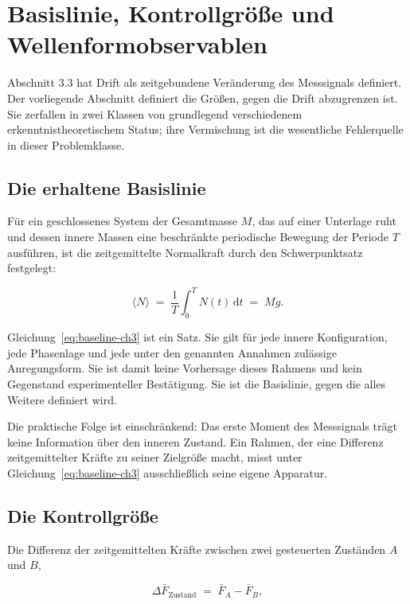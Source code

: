 \documentclass[12pt,a4paper]{report}
\begin{document}
\section{Basislinie, Kontrollgröße und Wellenformobservablen}
\label{sec:baseline-and-observables}

Abschnitt 3.3 hat Drift als zeitgebundene Veränderung des Messsignals
definiert. Der vorliegende Abschnitt definiert die Größen, gegen die
Drift abzugrenzen ist. Sie zerfallen in zwei Klassen von grundlegend
verschiedenem erkenntnistheoretischem Status; ihre Vermischung ist die
wesentliche Fehlerquelle in dieser Problemklasse.

\subsection{Die erhaltene Basislinie}

Für ein geschlossenes System der Gesamtmasse $M$, das auf einer Unterlage
ruht und dessen innere Massen eine beschränkte periodische Bewegung der
Periode $T$ ausführen, ist die zeitgemittelte Normalkraft durch den
Schwerpunktsatz festgelegt:

\begin{equation}
  \langle N \rangle
  \;=\; \frac{1}{T}\int_{0}^{T} N(t)\,\mathrm{d}t
  \;=\; M g .
  \label{eq:baseline-ch3}
\end{equation}

Gleichung~\eqref{eq:baseline-ch3} ist ein Satz. Sie gilt für jede innere
Konfiguration, jede Phasenlage und jede unter den genannten Annahmen
zulässige Anregungsform. Sie ist damit keine Vorhersage dieses Rahmens
und kein Gegenstand experimenteller Bestätigung. Sie ist die Basislinie,
gegen die alles Weitere definiert wird.

Die praktische Folge ist einschränkend: Das erste Moment des Messsignals
trägt keine Information über den inneren Zustand. Ein Rahmen, der eine
Differenz zeitgemittelter Kräfte zu seiner Zielgröße macht, misst unter
Gleichung~\eqref{eq:baseline-ch3} ausschließlich seine eigene Apparatur.

\subsection{Die Kontrollgröße}

Die Differenz der zeitgemittelten Kräfte zwischen zwei gesteuerten
Zuständen $A$ und $B$,

\begin{equation}
  \Delta \bar{F}_{\mathrm{Zustand}} \;=\; \bar{F}_{A} - \bar{F}_{B},
  \label{eq:control-ch3}
\end{equation}
\end{document}

